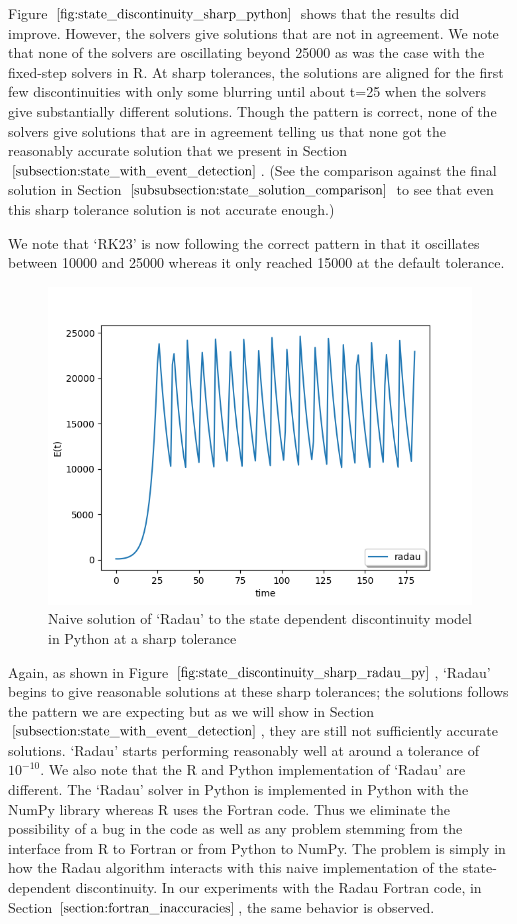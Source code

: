 Figure $\ref{fig:state_discontinuity_sharp_python}$ shows that the results did improve. However, the solvers give solutions that are not in agreement. We note that none of the solvers are oscillating beyond 25000 as was the case with the fixed-step solvers in R. At sharp tolerances, the solutions are aligned for the first few discontinuities with only some blurring until about t=25 when the solvers give substantially different solutions. Though the pattern is correct, none of the solvers give solutions that are in agreement telling us that none got the reasonably accurate solution that we present in Section $\ref{subsection:state_with_event_detection}$. (See the comparison against the final solution in Section $\ref{subsubsection:state_solution_comparison}$ to see that even this sharp tolerance solution is not accurate enough.)

We note that `RK23' is now following the correct pattern in that it oscillates between 10000 and 25000 whereas it only reached 15000 at the default tolerance. 

\begin{figure}[H]
\centering
\includegraphics[width=0.7\linewidth]{./figures/state_discontinuity_sharp_radau_py}
\caption{Naive solution of `Radau' to the state dependent discontinuity model in Python at a sharp tolerance}
\label{fig:state_discontinuity_sharp_radau_py}
\end{figure}

Again, as shown in Figure $\ref{fig:state_discontinuity_sharp_radau_py}$, `Radau' begins to give reasonable solutions at these sharp tolerances; the solutions follows the pattern we are expecting but as we will show in Section $\ref{subsection:state_with_event_detection}$, they are still not sufficiently accurate solutions. `Radau' starts performing reasonably well at around a tolerance of $10^{-10}$. We also note that the R and Python implementation of `Radau' are different. The `Radau' solver in Python is implemented in Python with the NumPy library whereas R uses the Fortran code. Thus we eliminate the possibility of a bug in the code as well as any problem stemming from the interface from R to Fortran or from Python to NumPy. The problem is simply in how the Radau algorithm interacts with this naive implementation of the state-dependent discontinuity. In our experiments with the Radau Fortran code, in Section $\ref{section:fortran_inaccuracies}$, the same behavior is observed.

